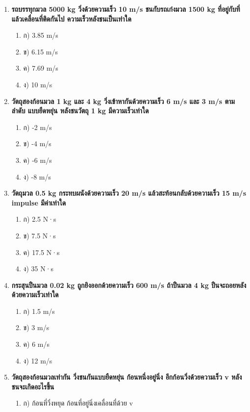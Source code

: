 \documentclass[12pt]{article}
\begin{document}
\begin{enumerate}
\begin{enumerate}
\item ก) N·s
\item ข) N/m
\item ค) N·s²
\item ง) N/m²
\end{enumerate}
\item \textbf{รถบรรทุกมวล 5000 kg วิ่งด้วยความเร็ว 10 m/s ชนกับรถเก๋งมวล 1500 kg ที่อยู่กับที่ แล้วเคลื่อนที่ติดกันไป ความเร็วหลังชนเป็นเท่าใด}
\begin{enumerate}
\item ก) 3.85 m/s
\item ข) 6.15 m/s
\item ค) 7.69 m/s
\item ง) 10 m/s
\end{enumerate}
\item \textbf{วัตถุสองก้อนมวล 1 kg และ 4 kg วิ่งเข้าหากันด้วยความเร็ว 6 m/s และ 3 m/s ตามลำดับ แบบยืดหยุ่น หลังชนวัตถุ 1 kg มีความเร็วเท่าใด}
\begin{enumerate}
\item ก) -2 m/s
\item ข) -4 m/s
\item ค) -6 m/s
\item ง) -8 m/s
\end{enumerate}
\item \textbf{วัตถุมวล 0.5 kg กระทบผนังด้วยความเร็ว 20 m/s แล้วสะท้อนกลับด้วยความเร็ว 15 m/s impulse มีค่าเท่าใด}
\begin{enumerate}
\item ก) 2.5 N·s
\item ข) 7.5 N·s
\item ค) 17.5 N·s
\item ง) 35 N·s
\end{enumerate}
\item \textbf{กระสุนปืนมวล 0.02 kg ถูกยิงออกด้วยความเร็ว 600 m/s ถ้าปืนมวล 4 kg ปืนจะถอยหลังด้วยความเร็วเท่าใด}
\begin{enumerate}
\item ก) 1.5 m/s
\item ข) 3 m/s
\item ค) 6 m/s
\item ง) 12 m/s
\end{enumerate}
\item \textbf{วัตถุสองก้อนมวลเท่ากัน วิ่งชนกันแบบยืดหยุ่น ก้อนหนึ่งอยู่นิ่ง อีกก้อนวิ่งด้วยความเร็ว v หลังชนจะเกิดอะไรขึ้น}
\begin{enumerate}
\item ก) ก้อนที่วิ่งหยุด ก้อนที่อยู่นิ่งเคลื่อนที่ด้วย v

\end{enumerate}
\end{enumerate}
\end{document}
